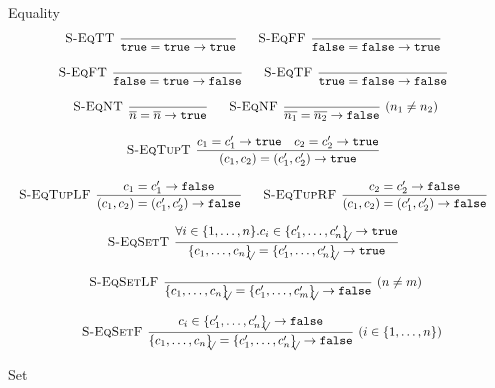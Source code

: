 \documentclass[a4paper]{article}
\newcommand{\s}[1]{\mathtt{#1}}
\newcommand{\sLb}{\s{\{}}
\newcommand{\sRb}{\s{\}}}
\newcommand{\strue}{\s{true}}
\newcommand{\sfalse}{\s{false}}
\newcommand{\sset}[1]{\sLb #1 \sRb}
\newcommand{\ssetc}[1]{\sset{#1}_{\!\!\!\surd}}
\newcommand{\step}{\to}
\renewcommand{\rule}[3][]{\ \mbox{\textsc{#1 }}\dfrac{#2}{#3}\ }
\begin{document}
Equality
\[\begin{array}{c}
\rule[S-EqTT]{}{\strue = \strue \step \strue}
\quad
\rule[S-EqFF]{}{\sfalse = \sfalse \step \strue}
\quad\\\\
\rule[S-EqFT]{}{\sfalse = \strue \step \sfalse}
\quad
\rule[S-EqTF]{}{\strue = \sfalse \step \sfalse}
\quad\\\\
\rule[S-EqNT]{}{\overline{n} = \overline{n} \step \strue}
\quad
\rule[S-EqNF]{}{\overline{n_1} = \overline{n_2} \step \sfalse} (n_1 \neq n_2)
\quad\\\\
\rule[S-EqTupT]{c_1 = c_1' \step \strue \quad c_2 = c_2' \step \strue}
  {(c_1, c_2) = (c_1', c_2') \step \strue}
\quad\\\\
\rule[S-EqTupLF]{c_1 = c_1' \step \sfalse}
  {(c_1, c_2) = (c_1', c_2') \step \sfalse}
\quad
\rule[S-EqTupRF]{c_2 = c_2' \step \sfalse}
  {(c_1, c_2) = (c_1', c_2') \step \sfalse}
\quad\\\\
\rule[S-EqSetT]{\forall i \in \{1,\ldots,n\}. c_i \in  \ssetc{c'_1,\ldots,c'_n} \step \strue}
  {\ssetc{c_1,\ldots,c_n} = \ssetc{c'_1,\ldots,c'_n} \step \strue}
\quad\\\\
\rule[S-EqSetLF]{}{\ssetc{c_1,\ldots,c_n} = \ssetc{c'_1,\ldots,c'_m} \step \sfalse}(n \neq m)
\quad\\\\
\rule[S-EqSetF]{c_i \in \ssetc{c'_1,\ldots,c'_n} \step \sfalse}
  {\ssetc{c_1,\ldots,c_n} = \ssetc{c'_1,\ldots,c'_n} \step \sfalse}(i \in \{1,\ldots,n\})

\end{array}\]

Set
\end{document}

